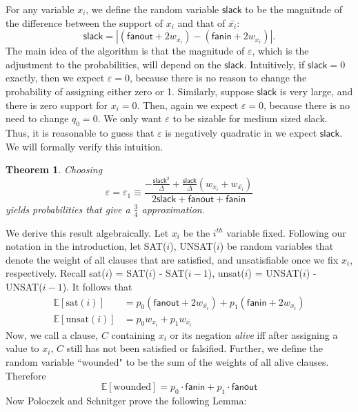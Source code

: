 \documentclass[11pt,letter]{article}
\newtheorem{theorem}{Theorem}
\numberwithin{theorem}{section}
\begin{document}
For any variable $x_i$, we define the random variable $\mathsf{slack}$ to be the magnitude of the difference between the support of $x_i$ and that of $\bar{x_i}$:
\begin{equation}
\mathsf{slack} = |(\mathsf{fanout} + 2w_{\bar{x_i}}) -(\mathsf{fanin} + 2w_{x_i})|.
\end{equation}
The main idea of the algorithm is that the magnitude of $\varepsilon$, which is the adjustment to the probabilities, will depend on the $\mathsf{slack}$. Intuitively, if $\mathsf{slack} = 0$ exactly, then we expect $\varepsilon = 0$, because there is no reason to change the probability of assigning either zero or 1. Similarly, suppose $\mathsf{slack}$ is very large, and there is zero support for $x_i = 0$. Then, again we expect $\varepsilon = 0$, because there is no need to change $q_0 = 0$. We only want $\varepsilon$ to be sizable for medium sized slack. Thus, it is reasonable to guess that $\varepsilon$ is negatively quadratic in we expect $\mathsf{slack}$. We will formally verify this intuition.
\begin{theorem}
Choosing $$\varepsilon = \varepsilon_1 \equiv \frac{-\frac{\mathsf{slack}^2}{\Delta} + \frac{\mathsf{slack}}{\Delta}(w_{x_i} + w_{\bar{x_i}})}{2\mathsf{slack}+ \mathsf{fanout} + \mathsf{fanin}}$$ yields probabilities that give a $\frac{3}{4}$ approximation.
\end{theorem}
We derive this result algebraically. Let $x_i$ be the $i^{th}$ variable fixed. Following our notation in the introduction, let SAT($i$), UNSAT($i$) be random variables that denote the weight of all clauses that are satisfied, and unsatisfiable once we fix $x_i$, respectively. Recall sat($i$) = SAT($i$) - SAT($i-1$), unsat($i$) = UNSAT($i$) - UNSAT($i-1$). It follows that
\begin{align}
\mathbb{E}[\textrm{sat}(i)] &= p_0(\mathsf{fanout} + 2w_{\bar{x_i}}) + p_1(\mathsf{fanin} + 2w_{x_i})\\
\mathbb{E}[\textrm{unsat}(i)] &= p_0w_{x_i} + p_1w_{\bar{x_i}}
\end{align}
Now, we call a clause, $C$ containing $x_i$ or its negation \textit{alive} iff after assigning a value to $x_i$, $C$ still has not been satisfied or falsified. Further, we define the random variable ``wounded" to be the sum of the weights of all alive clauses. Therefore
\begin{equation}
\mathbb{E}[\textrm{wounded}] = p_0 \cdot \mathsf{fanin} + p_1 \cdot \mathsf{fanout}
\end{equation}
Now Poloczek and Schnitger prove the following Lemma:
\end{document}
